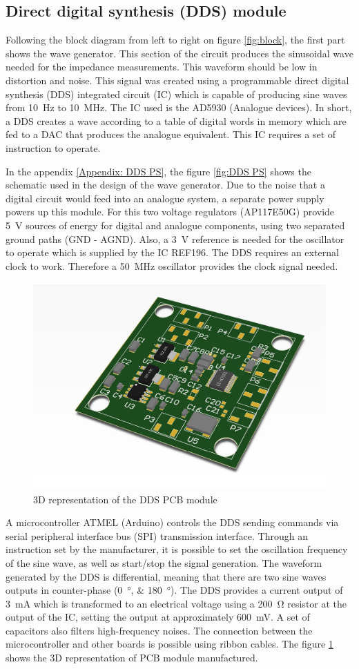 \subsection{Direct digital synthesis (DDS) module}
\label{section DDS}
Following the block diagram from left to right on figure \ref{fig:block}, the first part shows the wave generator. This section of the circuit produces the sinusoidal wave needed for the impedance measurements. This waveform should be low in distortion and noise. This signal was created using a programmable direct digital synthesis (DDS) integrated circuit (IC) which is capable of producing sine waves from \SI{10}{\hertz} to \SI{10}{\mega\hertz}. The IC used is the AD5930 (Analogue devices). In short, a DDS creates a wave according to a table of digital words in memory which are fed to a DAC that produces the analogue equivalent. This IC requires a set of instruction to operate. 

In the appendix \ref{Appendix: DDS PS}, the figure \ref{fig:DDS PS} shows the schematic used in the design of the wave generator. Due to the noise that a digital circuit would feed into an analogue system, a separate power supply powers up this module. For this two voltage regulators (AP117E50G) provide \SI{5}{\volt} sources of energy for digital and analogue components, using two separated ground paths (GND - AGND). Also, a \SI{3}{\volt} reference is needed for the oscillator to operate which is supplied by the IC REF196. The DDS requires an external clock to work. Therefore a \SI{50}{\mega\hertz} oscillator provides the clock signal needed.

\begin{figure}[!htpb]
	\centering
	\includegraphics[width=7.5 cm,keepaspectratio]{figure_DDS}
	\caption{3D representation of the DDS PCB module}
	\label{fig:3D DDS}
\end{figure}

A microcontroller ATMEL (Arduino) controls the DDS sending commands via serial peripheral interface bus (SPI) transmission interface. Through an instruction set by the manufacturer, it is possible to set the oscillation frequency of the sine wave, as well as start/stop the signal generation. The waveform generated by the DDS is differential, meaning that there are two sine waves outputs in counter-phase (\SIlist{0;180}{\degree}). The DDS provides a current output of \SI{3}{\mA} which is transformed to an electrical voltage using a \SI{200}{\ohm} resistor at the output of the IC, setting the output at approximately \SI{600}{\mV}. A set of capacitors also filters high-frequency noises. The connection between the microcontroller and other boards is possible using ribbon cables. The figure \ref{fig:3D DDS} shows the 3D representation of PCB module manufactured.

